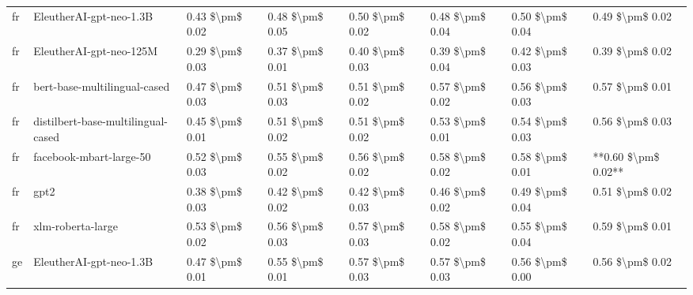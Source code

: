 \begin{tabular}{llllllll}
      fr &            EleutherAI-gpt-neo-1.3B & 0.43 \$\textbackslash pm\$ 0.02 &           0.48 \$\textbackslash pm\$ 0.05 &       0.50 \$\textbackslash pm\$ 0.02 &        0.48 \$\textbackslash pm\$ 0.04 &                         0.50 \$\textbackslash pm\$ 0.04 &     0.49 \$\textbackslash pm\$ 0.02 \\
      fr &            EleutherAI-gpt-neo-125M & 0.29 \$\textbackslash pm\$ 0.03 &           0.37 \$\textbackslash pm\$ 0.01 &       0.40 \$\textbackslash pm\$ 0.03 &        0.39 \$\textbackslash pm\$ 0.04 &                         0.42 \$\textbackslash pm\$ 0.03 &     0.39 \$\textbackslash pm\$ 0.02 \\
      fr &       bert-base-multilingual-cased & 0.47 \$\textbackslash pm\$ 0.03 &           0.51 \$\textbackslash pm\$ 0.03 &       0.51 \$\textbackslash pm\$ 0.02 &        0.57 \$\textbackslash pm\$ 0.02 &                         0.56 \$\textbackslash pm\$ 0.03 &     0.57 \$\textbackslash pm\$ 0.01 \\
      fr & distilbert-base-multilingual-cased & 0.45 \$\textbackslash pm\$ 0.01 &           0.51 \$\textbackslash pm\$ 0.02 &       0.51 \$\textbackslash pm\$ 0.02 &        0.53 \$\textbackslash pm\$ 0.01 &                         0.54 \$\textbackslash pm\$ 0.03 &     0.56 \$\textbackslash pm\$ 0.03 \\
      fr &            facebook-mbart-large-50 & 0.52 \$\textbackslash pm\$ 0.03 &           0.55 \$\textbackslash pm\$ 0.02 &       0.56 \$\textbackslash pm\$ 0.02 &        0.58 \$\textbackslash pm\$ 0.02 &                         0.58 \$\textbackslash pm\$ 0.01 & **0.60 \$\textbackslash pm\$ 0.02** \\
      fr &                               gpt2 & 0.38 \$\textbackslash pm\$ 0.03 &           0.42 \$\textbackslash pm\$ 0.02 &       0.42 \$\textbackslash pm\$ 0.03 &        0.46 \$\textbackslash pm\$ 0.02 &                         0.49 \$\textbackslash pm\$ 0.04 &     0.51 \$\textbackslash pm\$ 0.02 \\
      fr &                  xlm-roberta-large & 0.53 \$\textbackslash pm\$ 0.02 &           0.56 \$\textbackslash pm\$ 0.03 &       0.57 \$\textbackslash pm\$ 0.03 &        0.58 \$\textbackslash pm\$ 0.02 &                         0.55 \$\textbackslash pm\$ 0.04 &     0.59 \$\textbackslash pm\$ 0.01 \\
      ge &            EleutherAI-gpt-neo-1.3B & 0.47 \$\textbackslash pm\$ 0.01 &           0.55 \$\textbackslash pm\$ 0.01 &       0.57 \$\textbackslash pm\$ 0.03 &        0.57 \$\textbackslash pm\$ 0.03 &                         0.56 \$\textbackslash pm\$ 0.00 &     0.56 \$\textbackslash pm\$ 0.02 \\

\end{tabular}
